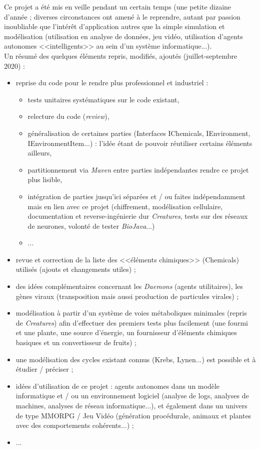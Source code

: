 \documentclass[11pt,twoside,a4paper]{article}
\begin{document}
Ce projet a {\'e}t{\'e} mis en veille pendant un certain temps (une petite dizaine d'ann{\'e}e ; diverses circonstances ont amen{\'e} {\`a} le reprendre, autant par passion inoubliable que l'int{\'e}r{\^e}t d'application autres que la simple simulation et mod{\'e}lisation (utilisation en analyse de donn{\'e}es, jeu vid{\'e}o, utilisation d'agents autonomes <<intelligents>> au sein d'un syst{\`e}me informatique...).~\\

Un r{\'e}sum{\'e} des quelques {\'e}l{\'e}ments repris, modifi{\'e}s, ajout{\'e}s (juillet-septembre 2020) : 
\begin{itemize}
	\item reprise du code pour le rendre plus professionnel et industriel : 
	\begin{itemize}
		\item tests unitaires syst{\'e}matiques sur le code existant, 
		\item relecture du code (\emph{review}), 
		\item g{\'e}n{\'e}ralisation de certaines parties (Interfaces IChemicals, IEnvironment, IEnvironmentItem...) : l'id{\'e}e {\'e}tant de pouvoir r{\'e}utiliser certains {\'e}l{\'e}ments ailleurs, 
		\item partitionnement via \emph{Maven} entre parties ind{\'e}pendantes rendre ce projet plus lisible, 
		\item int{\'e}gration de parties jusqu'ici s{\'e}par{\'e}es et / ou faites ind{\'e}pendamment mais en lien avec ce projet (chiffrement, mod{\'e}lisation cellulaire, documentation et reverse-ing{\'e}nierie dur \emph{Creatures}, tests sur des r{\'e}seaux de neurones, volont{\'e} de tester \emph{BioJava}...)
		\item ...
	\end{itemize} 
	\item revue et correction de la liste des <<{\'e}l{\'e}ments chimiques>> (Chemicals) utilis{\'e}s (ajouts et changements utiles) ; 
	\item des id{\'e}es compl{\'e}mentaires concernant les \emph{Daemons} (agents utilitaires), les g{\`e}nes viraux (transposition mais aussi production de particules virales) ; 
	\item mod{\'e}lisation {\`a} partir d'un syst{\`e}me de voies m{\'e}taboliques minimales (repris de \emph{Creatures}) afin d'effectuer des premiers tests plus facilement (une fourmi et une plante, une source d'{\'e}nergie, un fournisseur d'{\'e}l{\'e}ments chimiques basiques et un convertisseur de fruits) ;
	\item une mod{\'e}lisation des cycles existant connus (Krebs, Lynen...) est possible et {\`a} {\'e}tudier / pr{\'e}ciser ; 
	\item id{\'e}es d'utilisation de ce projet : agents autonomes dans un mod{\`e}le informatique et / ou un environnement logiciel (analyse de logs, analyses de machines, analyses de r{\'e}seau informatique...), et {\'e}galement dans un univers de type MMORPG / Jeu Vid{\'e}o (g{\'e}n{\'e}ration proc{\'e}durale, animaux et plantes avec des comportements coh{\'e}rents...) ; 
	\item ... 
\end{itemize}
\end{document}
